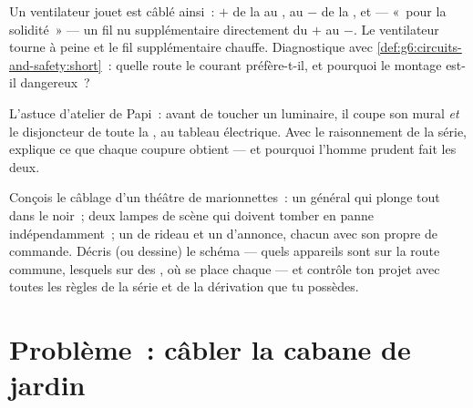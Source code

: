 \begin{exercise}[$\star\star$]\label{exo:g6:circuits-and-safety:10}
Un ventilateur jouet est câblé ainsi~: $+$ de la  au ,
 au $-$ de la , et --- «~pour la solidité~» --- un fil nu
supplémentaire directement du $+$ au $-$. Le ventilateur tourne à
peine et le fil supplémentaire chauffe. Diagnostique avec
\cref{def:g6:circuits-and-safety:short}~: quelle route le courant
préfère-t-il, et pourquoi le montage est-il dangereux~?
\end{exercise}

\begin{exercise}[$\star\star$]\label{exo:g6:circuits-and-safety:11}
L'astuce d'atelier de Papi~: avant de toucher un luminaire, il coupe
son  mural \emph{et} le disjoncteur de toute la ,
au tableau électrique. Avec le raisonnement de la série, explique ce
que chaque coupure obtient --- et pourquoi l'homme prudent fait les
deux.
\end{exercise}

\begin{exercise}[$\star\star\star$]\label{exo:g6:circuits-and-safety:12}
Conçois le câblage d'un théâtre de marionnettes~: un 
général qui plonge tout dans le noir~; deux lampes de scène qui
doivent tomber en panne indépendamment~; un  de rideau et un
 d'annonce, chacun avec son propre  de commande.
Décris (ou dessine) le schéma --- quels appareils sont sur la route
commune, lesquels sur des , où se place chaque
 --- et contrôle ton projet avec toutes les règles de la
série et de la dérivation que tu possèdes.
\end{exercise}

\section{Problème~: câbler la cabane de jardin}

